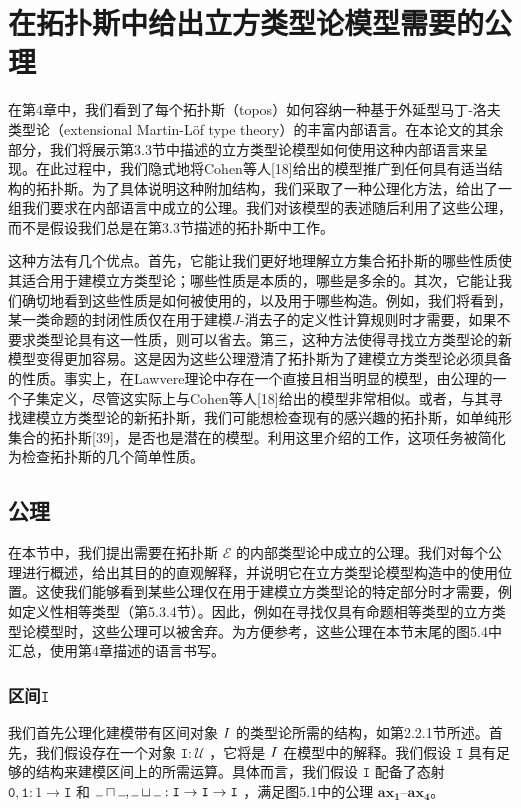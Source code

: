\documentclass{ctexrep}
\let\mathbb\relax %
\theoremstyle{plain}
\theoremstyle{definition}
\theoremstyle{remark}
\newcommand{\calE}{\mathcal{E}}
\newcommand\calU{\mathcal{U}}
\newcommand\bbI{\mathbb{I}}
\newcommand\ttI{\mathtt{I}}
\newcommand{\ttzero}{\mathtt{0}}
\newcommand{\ttone}{\mathtt{1}}
\newcommand{\ax}[1]{\mathbf{ax_{#1}}}
\newcommand{\ul}{{\rule[0ex]{0.5em}{0.4pt}}} %
\begin{document}
\chapter{在拓扑斯中给出立方类型论模型需要的公理}

在第4章中，我们看到了每个拓扑斯（topos）如何容纳一种基于外延型马丁-洛夫类型论（extensional Martin-Löf type theory）的丰富内部语言。在本论文的其余部分，我们将展示第3.3节中描述的立方类型论模型如何使用这种内部语言来呈现。在此过程中，我们隐式地将Cohen等人[18]给出的模型推广到任何具有适当结构的拓扑斯。为了具体说明这种附加结构，我们采取了一种公理化方法，给出了一组我们要求在内部语言中成立的公理。我们对该模型的表述随后利用了这些公理，而不是假设我们总是在第3.3节描述的拓扑斯中工作。

这种方法有几个优点。首先，它能让我们更好地理解立方集合拓扑斯的哪些性质使其适合用于建模立方类型论；哪些性质是本质的，哪些是多余的。其次，它能让我们确切地看到这些性质是如何被使用的，以及用于哪些构造。例如，我们将看到，某一类命题的封闭性质仅在用于建模$J$-消去子的定义性计算规则时才需要，如果不要求类型论具有这一性质，则可以省去。第三，这种方法使得寻找立方类型论的新模型变得更加容易。这是因为这些公理澄清了拓扑斯为了建模立方类型论必须具备的性质。事实上，在Lawvere理论中存在一个直接且相当明显的模型，由公理的一个子集定义，尽管这实际上与Cohen等人[18]给出的模型非常相似。或者，与其寻找建模立方类型论的新拓扑斯，我们可能想检查现有的感兴趣的拓扑斯，如单纯形集合的拓扑斯[39]，是否也是潜在的模型。利用这里介绍的工作，这项任务被简化为检查拓扑斯的几个简单性质。

\section{公理}

在本节中，我们提出需要在拓扑斯 $\calE$ 的内部类型论中成立的公理。我们对每个公理进行概述，给出其目的的直观解释，并说明它在立方类型论模型构造中的使用位置。这使我们能够看到某些公理仅在用于建模立方类型论的特定部分时才需要，例如定义性相等类型（第5.3.4节）。因此，例如在寻找仅具有命题相等类型的立方类型论模型时，这些公理可以被舍弃。为方便参考，这些公理在本节末尾的图5.4中汇总，使用第4章描述的语言书写。

\subsection{区间$\ttI$}

我们首先公理化建模带有区间对象 $\bbI$ 的类型论所需的结构，如第2.2.1节所述。首先，我们假设存在一个对象 $\ttI:\calU$ ，它将是 $\bbI$ 在模型中的解释。我们假设 $\ttI$ 具有足够的结构来建模区间上的所需运算。具体而言，我们假设 $\ttI$ 配备了态射 $\ttzero,\ttone:1→\ttI$ 和 $\ul \sqcap\ul , \ul \sqcup\ul  : \mathtt{I} \to \mathtt{I} \to \mathtt{I}$ ，满足图5.1中的公理 $\ax{1}$--$\ax{4}$。
\end{document}
